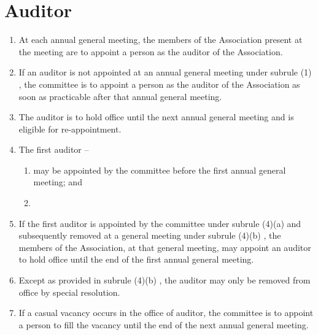 \documentclass[a4paper,11pt]{article}
\begin{document}
\section{Auditor}
\begin{enumerate}
	\item At each annual general meeting, the members of the Association present at the meeting are to appoint a person as the auditor of the Association.
	\item If an auditor is not appointed at an annual general meeting under subrule (1) , the committee is to appoint a person as the auditor of the Association as soon as practicable after that annual general meeting.
	\item The auditor is to hold office until the next annual general meeting and is eligible for re-appointment.
	
	\item The first auditor --
	\begin{enumerate}
		\item may be appointed by the committee before the first annual general meeting; and	
		\item 
	\end{enumerate}

	\item If the first auditor is appointed by the committee under subrule (4)(a) and subsequently removed at a general meeting under subrule (4)(b) , the members of the Association, at that general meeting, may appoint an auditor to hold office until the end of the first annual general meeting.
	\item Except as provided in subrule (4)(b) , the auditor may only be removed from office by special resolution.
	\item If a casual vacancy occurs in the office of auditor, the committee is to appoint a person to fill the vacancy until the end of the next annual general meeting.
\end{enumerate}
\end{document}
